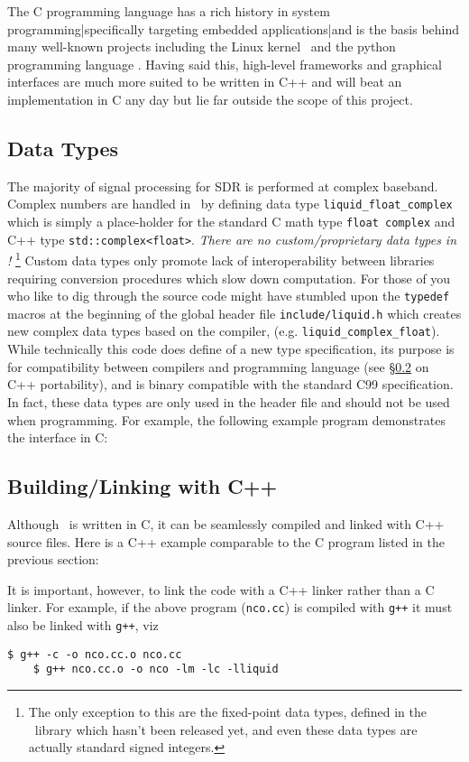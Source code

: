 The C programming language has a rich history in system
programming|specifically targeting embedded applications|and is the
basis behind many well-known projects including the Linux
kernel~\cite{linux-kernel:web}
and the python programming language \cite{python:web}.
Having said this, high-level frameworks and graphical interfaces are
much more suited to be written in C++ and will beat an implementation in
C any day but lie far outside the scope of this project.

\subsection{Data Types}
\label{section:data_structures:data_types}
The majority of signal processing for SDR is performed at complex baseband.
Complex numbers are handled in \liquid\ by defining data type
{\tt liquid\_float\_complex} which is simply a place-holder for the
standard
C math type {\tt float complex} and C++ type {\tt std::complex<float>}.
{\em There are no custom/proprietary data types in \liquid!}%
\footnote{
    The only exception to this are the fixed-point data types,
    defined in the \liquidfpm\ library which hasn't been released yet,
    and even these data types are actually standard signed integers.}
Custom data types only promote lack of interoperability between
libraries requiring conversion procedures which slow down computation.
For those of you who like to dig through the source code might have
stumbled upon the {\tt typedef} macros at the beginning of the global 
header file {\tt include/liquid.h} which creates new complex data types
based on the compiler, 
(e.g. {\tt liquid\_complex\_float}).
While technically this code does define of a new type specification,
its purpose is for compatibility between compilers and programming
language
(see \S\ref{section:data_structures:c++} on C++ portability),
and is binary compatible with the standard C99 specification.
In fact, these data types are only used in the header file and should
not be used when programming.
For example, the following example program demonstrates the interface in
C:
%

%


\subsection{Building/Linking with C++}
\label{section:data_structures:c++}
Although \liquid\ is written in C, it can be seamlessly compiled and linked
with C++ source files.
Here is a C++ example comparable to the C program listed in the previous
section:
%

%
It is important, however, to link the code with a C++ linker rather than
a C linker.
For example, if the above program ({\tt nco.cc}) is compiled with
{\tt g++} it must also be linked with {\tt g++}, viz
%
\begin{Verbatim}[fontsize=\small]
    $ g++ -c -o nco.cc.o nco.cc
    $ g++ nco.cc.o -o nco -lm -lc -lliquid
\end{Verbatim}
%

